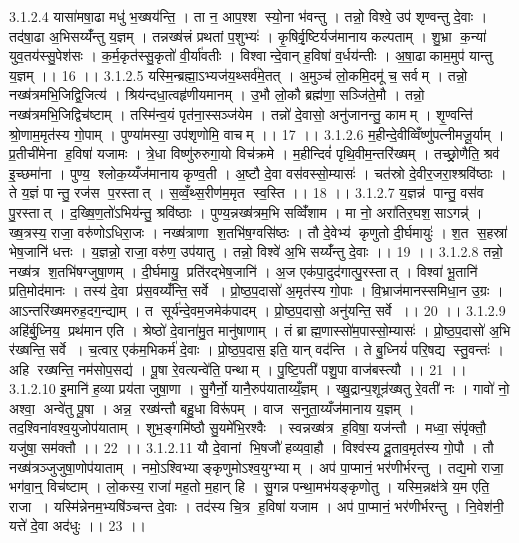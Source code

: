 3.1.2.4
यासा॑मषा॒ढा मधु॑ भ॒ख्षय॑न्ति॒ । ता न॒ आप॒श्श स्यो॒ना भ॑वन्तु । तन्नो॒ विश्वे॒ उप॑ शृण्वन्तु दे॒वाः । तद॑षा॒ढा अ॒भिसय्यँ॑न्तु य॒ज्ञम् । तन्नख्ष॑त्त्रं प्रथतां प॒शुभ्यः॑ । कृ॒षिर्वृ॒ष्टिर्यज॑मानाय कल्पताम् । शु॒भ्रा क॒न्या॑ युव॒तय॑स्सु॒पेश॑सः । क॒र्म॒कृत॑स्सु॒कृतो॑ वी॒र्या॑वतीः । विश्वान्दे॒वान् ह॒विषा॑ व॒र्धय॑न्तीः । अ॒षा॒ढाकाम॒मुप॑ यान्तु य॒ज्ञम् ।। 16 ।।
3.1.2.5
यस्मि॒न्ब्रह्मा॒ऽभ्यज॑य॒थ्सर्व॑मे॒तत् । अ॒मुञ्च॑ लो॒कमि॒दमू॑ च॒ सर्वम् । तन्नो॒ नख्ष॑त्रमभि॒जिद्वि॒जित्य॑ । श्रिय॑न्दधा॒त्वहृ॑णीयमानम् । उ॒भौ लो॒कौ ब्रह्म॑णा॒ सञ्जि॑ते॒मौ । तन्नो॒ नख्ष॑त्रमभि॒जिद्विच॑ष्टाम् । तस्मि॑न्व॒यं पृत॑ना॒स्सञ्ज॑येम । तन्नो॑ दे॒वासो॒ अनु॑जानन्तु॒ कामम् । शृ॒ण्वन्ति॑ श्रो॒णाम॒मृत॑स्य गो॒पाम् । पुण्या॑मस्या॒ उप॑शृणोमि॒ वाचम् ।। 17 ।।
3.1.2.6
म॒हीन्दे॒वीव्विँष्णु॑पत्नीमजू॒र्याम् । प्र॒तीची॑मेना ह॒विषा॑ यजामः । त्रे॒धा विष्णु॑रुरुगा॒यो विच॑क्रमे । म॒हीन्दिवं॑ पृथि॒वीम॒न्तरि॑ख्षम् । तच्छ्रो॒णैति॒ श्रव॑ इ॒च्छमा॑ना । पुण्य॒॒ श्लोक॒य्यँज॑मानाय कृण्व॒ती । अ॒ष्टौ दे॒वा वस॑वस्सो॒म्यासः॑ । चत॑स्रो दे॒वीर॒जरा॒श्श्रवि॑ष्ठाः । ते य॒ज्ञं पान्तु॒ रज॑स प॒रस्तात् । स॒व्वँ॒थ्स॒रीण॑म॒मृत॑ स्व॒स्ति ।। 18 ।।
3.1.2.7
य॒ज्ञन्न॑ पान्तु॒ वस॑व पु॒रस्तात् । द॒ख्षि॒ण॒तो॑ऽभिय॑न्तु॒ श्रवि॑ष्ठाः । पुण्य॒न्नख्ष॑त्रम॒भि सव्विँ॑शाम । मा नो॒ अरा॑तिर॒घश॒॒साऽगन्न्॑ । ख्ष॒त्रस्य॒ राजा॒ वरु॑णोऽधिरा॒जः । नख्ष॑त्राणा श॒तभि॑ष॒ग्वसि॑ष्ठः । तौ दे॒वेभ्य॑ कृणुतो दी॒र्घमायुः॑ । श॒त स॒हस्रा॑ भेष॒जानि॑ धत्तः । य॒ज्ञन्नो॒ राजा॒ वरु॑ण॒ उप॑यातु । तन्नो॒ विश्वे॑ अ॒भि सय्यँ॑न्तु दे॒वाः ।। 19 ।।
3.1.2.8
तन्नो॒ नख्ष॑त्र श॒तभि॑षग्जुषा॒णम् । दी॒र्घमायु॒ प्रति॑रद्भेष॒जानि॑ । अ॒ज एक॑पा॒दुद॑गात्पु॒रस्तात् । विश्वा॑ भू॒तानि॑ प्रति॒मोद॑मानः । तस्य॑ दे॒वा प्र॑स॒वय्यँ॑न्ति॒ सर्वे । प्रो॒ष्ठ॒प॒दासो॑ अ॒मृत॑स्य गो॒पाः । वि॒भ्राज॑मानस्समिधा॒न उ॒ग्रः । आऽन्तरि॑ख्षमरुह॒दग॒न्द्याम् । त सूर्य॑न्दे॒वम॒जमेक॑पादम् । प्रो॒ष्ठ॒प॒दासो॒ अनु॑यन्ति॒ सर्वे ।। 20 ।।
3.1.2.9
अहि॑र्बु॒ध्निय॒ प्रथ॑मान एति । श्रेष्ठो॑ दे॒वाना॑मु॒त मानु॑षाणाम् । तं ब्राह्म॒णास्सो॑म॒पास्सो॒म्यासः॑ । प्रो॒ष्ठ॒प॒दासो॑ अ॒भि र॑ख्षन्ति॒ सर्वे । च॒त्वार॒ एक॑म॒भिकर्म॑ दे॒वाः । प्रो॒ष्ठ॒प॒दास॒ इति॒ यान् वद॑न्ति । ते बु॒ध्नियं॑ परि॒षद्य॑ स्तु॒वन्तः॑ । अहि॑ रख्षन्ति॒ नम॑सोप॒सद्य॑ । पू॒षा रे॒वत्यन्वे॑ति॒ पन्थाम् । पु॒ष्टि॒पती॑ पशु॒पा वाज॑बस्त्यौ ।। 21 ।।
3.1.2.10
इ॒मानि॑ ह॒व्या प्रय॑ता जुषा॒णा । सु॒गैर्नो॒ यानै॒रुप॑याताय्यँ॒ज्ञम् । ख्षु॒द्रान्प॒शून्र॑ख्षतु रे॒वती॑ नः । गावो॑ नो॒ अश्वा॒॒ अन्वे॑तु पू॒षा । अन्न॒॒ रख्ष॑न्तौ बहु॒धा विरू॑पम् । वाज॑ सनुता॒य्यँज॑मानाय य॒ज्ञम् । तद॒श्विना॑वश्व॒युजोप॑याताम् । शुभ॒ङ्गमि॑ष्ठौ सु॒यमे॑भि॒रश्वैः । स्वन्नख्ष॑त्र ह॒विषा॒ यज॑न्तौ । मध्वा॒ संपृ॑क्तौ॒ यजु॑षा॒ सम॑क्तौ ।। 22 ।।
3.1.2.11
यौ दे॒वानां भि॒षजौ॑ हव्यवा॒हौ । विश्व॑स्य दू॒ताव॒मृत॑स्य गो॒पौ । तौ नख्ष॑त्रञ्जुजुषा॒णोप॑याताम् । नमो॒ऽश्विभ्याङ्कृणुमोऽश्व॒युग्भ्याम् । अप॑ पा॒प्मानं॒ भर॑णीर्भरन्तु । तद्य॒मो राजा॒ भग॑वा॒न्॒ विच॑ष्टाम् । लो॒कस्य॒ राजा॑ मह॒तो म॒हान् हि । सु॒गन्नपन्था॒मभ॑यङ्कृणोतु । यस्मि॒न्नक्ष॑त्रे य॒म एति॒ राजा । यस्मि॑न्नेनम॒भ्यषि॑ञ्चन्त दे॒वाः । तद॑स्य चि॒त्र ह॒विषा॑ यजाम । अप॑ पा॒प्मानं॒ भर॑णीर्भरन्तु । नि॒वेश॑नी॒ यत्ते॑ दे॒वा अद॑धुः ।। 23 ।।
